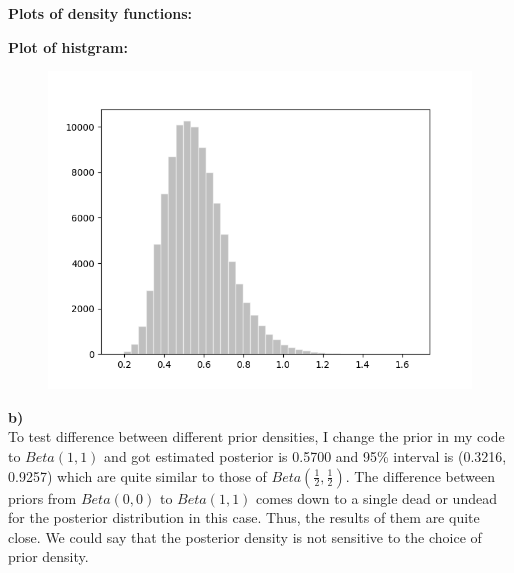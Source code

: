 \documentclass{article}
\begin{document}
\textbf{Plots of density functions:}
\begin{figure}[H]
\centering  
{}
\label{Fig}
\end{figure}

\textbf{Plot of histgram:}
\begin{figure}[H]
\centering  
\includegraphics[scale=0.5]{2ahist.png}
\label{Fig}
\end{figure}

\textbf{b)}\\
To test difference between different prior densities, I change the prior in my code to $Beta(1,1)$ and got estimated posterior is 0.5700 and 95\% interval is (0.3216, 0.9257) which are  quite similar to those of $Beta(\frac{1}{2},\frac{1}{2})$. The difference between priors from $Beta(0,0)$ to $Beta(1,1)$ comes down to a single dead or undead for the posterior distribution in this case. Thus, the results of them are quite close. We could say that the posterior density is not sensitive to the choice of prior density.  \\
\end{document}

